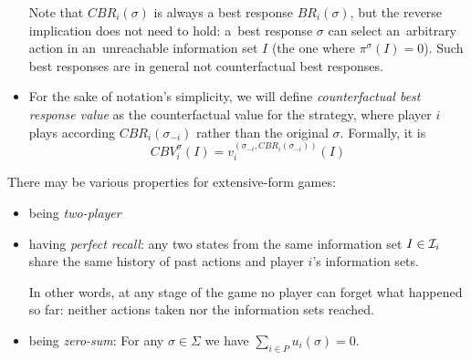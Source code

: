 \begin{itemize}
    Note that $CBR _i (\sigma)$ is always a best response $BR _i (\sigma)$, but the reverse implication does not need to hold:
    a~best response $\sigma$ can select an~arbitrary action in an~unreachable information set $I$ (the one where $\pi ^\sigma (I) = 0$).
    Such best responses are in general not counterfactual best responses.

  \item For the sake of notation's simplicity, we will define \emph{counterfactual best response value} as the counterfactual value for the strategy, where player $i$ plays according $CBR _i (\sigma _{-i})$ rather than the original $\sigma$.
    Formally, it is
    \[ CBV _i ^\sigma (I) = v _i ^{(\sigma _{-i}, CBR _i (\sigma _{-i} ))} (I) \]

\end{itemize}

There may be various properties for extensive-form games:

\begin{itemize}
  \item being \emph{two-player}
  \item having \emph{perfect recall}: any two states from the same information set $I \in \mathcal{I} _i$ share the same history of past actions and player $i$'s information sets.

    In other words, at any stage of the game no player can forget what happened so far:
    neither actions taken nor the information sets reached.
  \item being \emph{zero-sum}: For any $\sigma \in \Sigma$ we have $\sum _{i \in P} u _i (\sigma) = 0$.
\end{itemize}

